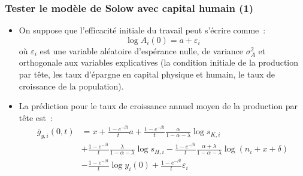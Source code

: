 \documentclass[10pt,notheorems]{beamer}
\theoremstyle{plain}
\theoremstyle{definition} %
\begin{document}
\begin{frame}
  \frametitle{Tester le modèle de Solow avec capital humain (1)}

  \begin{itemize}

  \item On suppose que l'efficacité initiale du travail peut s'écrire comme~:
    \[
      \log A_i(0) = a + \varepsilon_i
    \]
    où $\varepsilon_i$ est une variable aléatoire d'espérance nulle, de variance
    $\sigma_A^2$ et orthogonale aux variables explicatives (la condition
    initiale de la production par tête, les taux d'épargne en capital physique
    et humain, le taux de croissance de la population).\newline

  \item La prédiction pour le taux de croissance annuel
    moyen de la production par tête est~:
    {\small
    \[
      \begin{split}
        \bar g_{y,i}(0,t) &= x + \frac{1-e^{-\beta t}}{t} a + \frac{1-e^{-\beta t}}{t}\frac{\alpha}{1-\alpha-\lambda}\log s_{K,i} \\
                          &+ \frac{1-e^{-\beta t}}{t}\frac{\lambda}{1-\alpha-\lambda}\log s_{H,i} - \frac{1-e^{-\beta t}}{t}\frac{\alpha+\lambda}{1-\alpha-\lambda}\log (n_i+x+\delta)\\
                          &-\frac{1-e^{-\beta t}}{t} \log y_i(0) + \frac{1-e^{-\beta t}}{t} \varepsilon_i 
      \end{split}
    \]}
  \end{itemize}

\end{frame}
\end{document}
